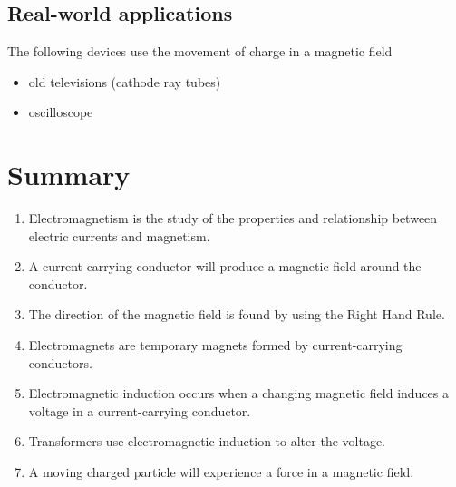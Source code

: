 \subsection{Real-world applications}
The following devices use the movement of charge in a magnetic field 
\begin{itemize}
\item old televisions (cathode ray tubes)
\item oscilloscope 
\end{itemize}



\section {Summary}
\begin {enumerate}
\item Electromagnetism is the study of the properties and relationship between electric currents and magnetism.
\item A current-carrying conductor will produce a magnetic field around the conductor.
\item The direction of the magnetic field is found by using the Right Hand Rule.
\item Electromagnets are temporary magnets formed by current-carrying conductors.
\item Electromagnetic induction occurs when a changing magnetic field induces a voltage in a current-carrying conductor.
\item Transformers use electromagnetic induction to alter the voltage.
\item A moving charged particle will experience a force in a magnetic field.
\end {enumerate}

